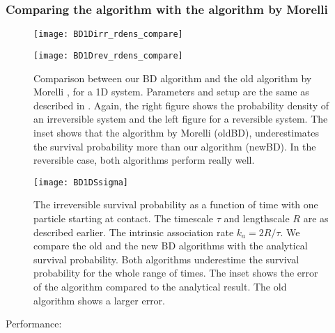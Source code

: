 \subsubsection{Comparing the algorithm with the algorithm by Morelli}

\begin{figure}[hb]
\begin{minipage}[ht]{.5\linewidth}
\centering
\texttt{[image: BD1Dirr\_rdens\_compare]}
\end{minipage}
\begin{minipage}[ht]{.5\linewidth}
\centering
\texttt{[image: BD1Drev\_rdens\_compare]}
\end{minipage}
\caption{ Comparison between our BD algorithm and the old algorithm by Morelli \cite{Morelli2008a}, for a 1D system. Parameters and setup are the same as described in . Again, the right figure shows the probability density of an irreversible system and the left figure for a reversible system. The inset shows that the algorithm by Morelli (oldBD), underestimates the survival probability more than our algorithm (newBD). In the reversible case, both algorithms perform really well.}
\end{figure}

\begin{figure}[hb]
\centering
\texttt{[image: BD1DSsigma]}
\caption{ The irreversible survival probability as a function of time with one particle starting at contact. The timescale $\tau$ and lengthscale $R$ are as described earlier. The intrinsic association rate $k_a=2 R/\tau$. We compare the old and the new BD algorithms with the analytical survival probability. Both algorithms underestime the survival probability for the whole range of times. The inset shows the error of the algorithm compared to the analytical result. The old algorithm shows a larger error.}
\end{figure}

Performance: 